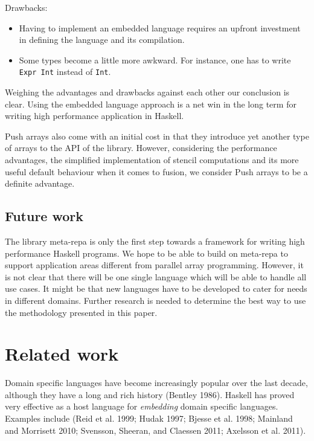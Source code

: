 \documentclass[preprint]{sigplanconf}
\begin{document}
Drawbacks:

\begin{itemize}
\item
  Having to implement an embedded language requires an upfront
  investment in defining the language and its compilation.
\item
  Some types become a little more awkward. For instance, one has to
  write \texttt{Expr Int} instead of \texttt{Int}.
\end{itemize}

Weighing the advantages and drawbacks against each other our conclusion
is clear. Using the embedded language approach is a net win in the long
term for writing high performance application in Haskell.

Push arrays also come with an initial cost in that they introduce yet
another type of arrays to the API of the library. However, considering
the performance advantages, the simplified implementation of stencil
computations and its more useful default behaviour when it comes to
fusion, we consider Push arrays to be a definite advantage.

\subsection{Future work}

The library meta-repa is only the first step towards a framework for
writing high performance Haskell programs. We hope to be able to build
on meta-repa to support application areas different from parallel array
programming. However, it is not clear that there will be one single
language which will be able to handle all use cases. It might be that
new languages have to be developed to cater for needs in different
domains. Further research is needed to determine the best way to use the
methodology presented in this paper.

\section{Related work}

Domain specific languages have become increasingly popular over the last
decade, although they have a long and rich history (Bentley 1986).
Haskell has proved very effective as a host language for
\emph{embedding} domain specific languages. Examples include (Reid et
al. 1999; Hudak 1997; Bjesse et al. 1998; Mainland and Morrisett 2010;
Svensson, Sheeran, and Claessen 2011; Axelsson et al. 2011).
\end{document}
